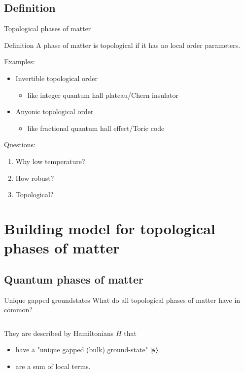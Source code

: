 \documentclass{beamer}
\begin{document}
\subsection{Definition}

\begin{frame}{Topological phases of matter}
	\begin{block}{Definition}
		A phase of matter is topological if it has no local order parameters.
	\end{block}
	\pause
	Examples:
	\begin{itemize}
		\item Invertible topological order
		\begin{itemize}
			\item like integer quantum hall plateau/Chern insulator
		\end{itemize}
		\item Anyonic topological order
		\begin{itemize}
			\item like fractional quantum hall effect/Toric code
		\end{itemize}
	\end{itemize}
	\pause
	Questions:
	\begin{enumerate}
		\item Why low temperature?
		\item How robust?
		\item Topological?
	\end{enumerate}
\end{frame}

\section{Building model for topological phases of matter}

\subsection{Quantum phases of matter}
\begin{frame}{Unique gapped groundstates}
	What do all topological phases of matter have in common?
	\pause
	\begin{columns}
		\begin{column}{0.7\textwidth}
			They are described by Hamiltonians $H$ that
			\begin{itemize}
				\item<3-> have a "unique gapped (bulk) ground-state" $\ket{\psi}$.
				\item<4-> are a sum of local terms.
			\end{itemize}
		\end{column}
		\begin{column}{0.3\textwidth}
			\begin{center}
				
			\end{center}
		\end{column}
	\end{columns}
	
	
\end{frame}
\end{document}

